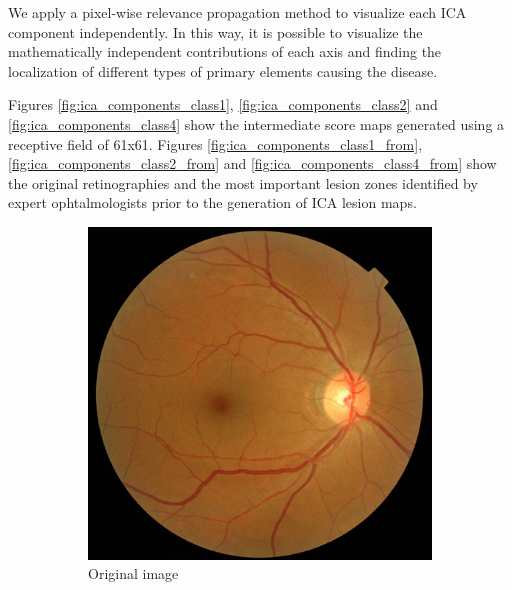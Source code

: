 \documentclass[review]{elsarticle}
\theoremstyle{definition} %
\theoremstyle{remark}
\begin{document}
We apply a pixel-wise relevance propagation method to visualize each ICA component independently. In this way, it is possible to visualize the mathematically independent contributions of each axis and finding the localization of different types of primary elements causing the disease. 

Figures \ref{fig:ica_components_class1}, \ref{fig:ica_components_class2} and \ref{fig:ica_components_class4} show the intermediate score maps generated using a receptive field of 61x61. Figures \ref{fig:ica_components_class1_from}, \ref{fig:ica_components_class2_from} and \ref{fig:ica_components_class4_from} show the original retinographies and the most important lesion zones identified by expert ophtalmologists prior to the generation of ICA lesion maps.

\begin{figure}[h!]
	\centering
	\begin{subfigure}[b]{0.28\textwidth}
		\centering
		\includegraphics[width=\textwidth]{./figures/ica_retine_maps/G1-P2/g1.png}
		\caption{Original image}	
	\end{subfigure}
	\begin{subfigure}[b]{0.28\textwidth}
		\centering

\end{subfigure}
\end{figure}
\end{document}
